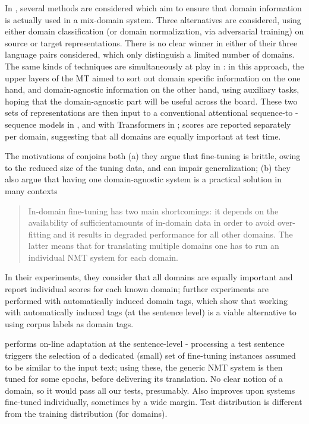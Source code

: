 \documentclass[11pt]{article}
\begin{document}
In \cite{Britz17mixing}, several methods are considered which aim to ensure that domain information is actually used in a mix-domain system. Three alternatives are considered, using either domain classification (or domain normalization, via adversarial training) on source or target representations. There is no clear winner in either of their three language pairs considered, which only distinguish a limited number of domains. The same kinds of techniques are simultaneously at play in \cite{Zeng18multidomain,Su19exploring}: in this approach, the upper layers of the MT aimed to sort out domain specific information on the one hand, and domain-agnostic information on the other hand, using auxiliary tasks, hoping that the domain-agnostic part will be useful across the board. These two sets of representations are then input to a conventional attentional sequence-to -sequence models in \cite{Zeng18multidomain}, and with Transformers in \cite{Su19exploring}; scores are reported separately per domain, suggesting that all domains are equally important at test time.


The motivations of \cite{Tars18multidomain} conjoins both (a) they argue that fine-tuning is brittle, owing to the reduced size of the tuning data, and can impair generalization; (b) they also argue that having one domain-agnostic system is a practical solution in many contexts
\begin{quote}
  In-domain fine-tuning has two main shortcomings: it depends on the availability of sufficientamounts of in-domain data in order to avoid over-fitting and it results in degraded performance for all other domains. The latter means that for translating multiple domains one has to run an individual NMT system for each domain.
\end{quote}
In their experiments, they consider that all domains are equally important and report individual scores for each known domain; further experiments are performed with automatically induced domain tags, which show that working with automatically induced tags (at the sentence level) is a viable alternative to using corpus labels as domain tags.

\cite{Farajian17multidomain} performs on-line adaptation at the sentence-level - processing a test sentence triggers the selection of a dedicated (small) set of fine-tuning instances assumed to be similar to the input text; using these, the generic NMT system is then tuned for some epochs, before delivering its translation. No clear notion of a domain, so it would pass all our tests, presumably.  Also improves upon systems fine-tuned individually, sometimes by a wide margin. Test distribution is different from the training distribution (for domains). 
\end{document}
